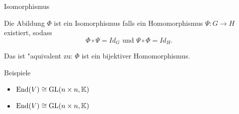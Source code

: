 \documentclass[class=article, crop=false]{standalone}
\begin{document}
\begin{zettel}{Isomorphismus}
\begin{flashcard}
    \begin{definition}[Isomorphismus]
        Die Abildung $\Phi$ ist ein Isomorphismus falls ein Homomorphismus $\Psi: G \longrightarrow H$ existiert, sodass
\[
    \Phi \circ \Psi = Id_G \text{ und } \Psi \circ \Phi =  Id_H 
.\]

Das ist "aquivalent zu: $\Phi$ ist ein bijektiver Homomorphismus.
\end{definition}
\end{flashcard}

\begin{example}[Homomorphismen]
Beispiele
    \begin{itemize}
        \item $\operatorname{End}(V) \cong \operatorname{GL}(n \times n,\mathbb{K}) $ 
        \item $\operatorname{End}(V) \cong \operatorname{GL}(n \times n,\mathbb{K}) $ 

    \end{itemize}
    
\end{example}
\end{zettel}
\end{document}
